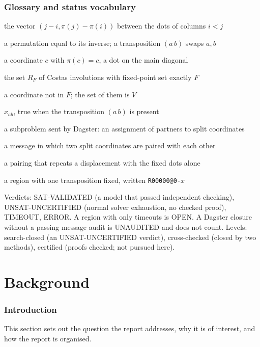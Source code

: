 \documentclass[11pt,a4paper]{article}
\theoremstyle{definition}
\newcommand{\code}[1]{\texttt{#1}}
\newcommand{\st}[1]{\textsf{#1}}
\begin{document}
\section*{Glossary and status vocabulary}
\begin{description}[style=nextline, leftmargin=2.6cm, itemsep=1pt]
\item[displacement] the vector $(j-i,\pi(j)-\pi(i))$ between the dots of columns $i<j$
\item[involution] a permutation equal to its inverse; a transposition $(a\,b)$ swaps $a,b$
\item[fixed point] a coordinate $c$ with $\pi(c)=c$, a dot on the main diagonal
\item[region] the set $R_F$ of Costas involutions with fixed-point set exactly $F$
\item[free coordinate] a coordinate not in $F$; the set of them is $V$
\item[edge variable] $x_{ab}$, true when the transposition $(a\,b)$ is present
\item[message] a subproblem sent by Dagster: an assignment of partners to split coordinates
\item[unsplit branch] a message in which two split coordinates are paired with each other
\item[seed-refuted] a pairing that repeats a displacement with the fixed dots alone
\item[case] a region with one transposition fixed, written \code{R00000@0-}$x$
\end{description}

\noindent Verdicts: \st{SAT-VALIDATED} (a model that passed independent checking),
\st{UNSAT-UNCERTIFIED} (normal solver exhaustion, no checked proof), \st{TIMEOUT}, \st{ERROR}.
A region with only timeouts is \st{OPEN}. A Dagster closure without a passing message
audit is \st{UNAUDITED} and does not count. Levels: \st{search-closed} (an
\st{UNSAT-UNCERTIFIED} verdict), \st{cross-checked} (closed by two methods), \st{certified}
(proofs checked; not pursued here).

\part{Background}

\section{Introduction}
This section sets out the question the report addresses, why it is of interest, and how the report is organised.
\end{document}
